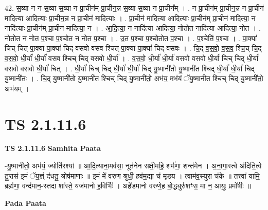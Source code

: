 \documentclass[17pt]{extarticle}
\begin{document}
42. स॒व्या न न स॒व्या स॒व्या न प्रा॒चीन॑म् प्रा॒चीन॒न्न स॒व्या स॒व्या न प्रा॒चीन᳚म् । . न प्रा॒चीन॑म् प्रा॒चीन॒न्न न प्रा॒चीन॑ मादित्या आदित्याः प्रा॒चीन॒न्न न प्रा॒चीन॑ मादित्याः । . प्रा॒चीन॑ मादित्या आदित्याः प्रा॒चीन॑म् प्रा॒चीन॑ मादित्या॒ न नादि॑त्याः प्रा॒चीन॑म् प्रा॒चीन॑ मादित्या॒ न । . आ॒दि॒त्या॒ न नादि॑त्या आदित्या॒ नोतोत नादि॑त्या आदित्या॒ नोत । . नोतोत न नोत प॒श्चा प॒श्चोत न नोत प॒श्चा । . उ॒त प॒श्चा प॒श्चोतोत प॒श्चा । . प॒श्चेति॑ प॒श्चा । . पा॒क्या॑ चिच् चित् पा॒क्या॑ पा॒क्या॑ चिद् वसवो वसव श्चित् पा॒क्या॑ पा॒क्या॑ चिद् वसवः । . चि॒द् व॒स॒वो॒ व॒स॒व॒ श्चि॒च् चि॒द् व॒स॒वो॒ धी॒र्या॑ धी॒र्या॑ वसव श्चिच् चिद् वसवो धी॒र्या᳚ । . व॒स॒वो॒ धी॒र्या॑ धी॒र्या॑ वसवो वसवो धी॒र्या॑ चिच् चिद् धी॒र्या॑ वसवो वसवो धी॒र्या॑ चित् । . धी॒र्या॑ चिच् चिद् धी॒र्या॑ धी॒र्या॑ चिद् यु॒ष्मानी॑तो यु॒ष्मानी॑त श्चिद् धी॒र्या॑ धी॒र्या॑ चिद् यु॒ष्मानी॑तः । . चि॒द् यु॒ष्मानी॑तो यु॒ष्मानी॑त श्चिच् चिद् यु॒ष्मानी॑तो॒ अभ॑य॒ मभ॑यं ॅयु॒ष्मानी॑त श्चिच् चिद् यु॒ष्मानी॑तो॒ अभ॑यम् । \newline
\pagebreak
{}
\section*{ TS 2.1.11.6 }

\textbf{TS 2.1.11.6 } \newline
\textbf{Samhita Paata} \newline

-यु॒ष्मानी॑तो॒ अभ॑यं॒ ज्योति॑रश्यां ॥ आ॒दि॒त्याना॒मव॑सा॒ नूत॑नेन सक्षी॒महि॒ शर्म॑णा॒ शन्त॑मेन । अ॒ना॒गा॒स्त्वे अ॑दिति॒त्वे तु॒रास॑ इ॒मं ॅय॒ज्ञ्ं द॑धतु॒ श्रोष॑माणाः ॥ इ॒मं मे॑ वरुण श्रुधी॒ हव॑म॒द्या च॑ मृडय । त्वाम॑व॒स्युरा च॑के ॥ तत्त्वा॑ यामि॒ ब्रह्म॑णा॒ वन्द॑मान॒-स्तदा शा᳚स्ते॒ यज॑मानो ह॒विर्भिः॑ । अहे॑डमानो वरुणे॒ह बो॒द्ध्युरु॑शꣳस॒ मा न॒ आयुः॒ प्रमो॑षीः ॥ \newline

\textbf{Pada Paata} \newline
\end{document}

